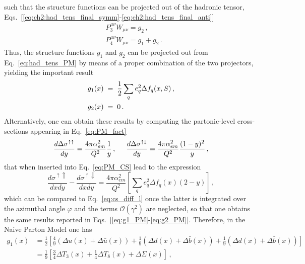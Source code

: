 such that the structure functions can be projected out of the hadronic tensor, Eqs.~[\ref{eq:ch2:had_tens_final_symm}-\ref{eq:ch2:had_tens_final_anti}]
\begin{align}
  &P_3^{\mu \nu} W_{\mu \nu} = g_2\,, \\
  &P_4^{\mu \nu} W_{\mu \nu} = g_1 + g_2 \,.
\end{align}
Thus, the structure functions $g_1$ and $g_2$ can be projected out from Eq.~\eqref{eq:had_tens_PM} by means of a proper combination of the two projectors, yielding the important result
\begin{align}
  &g_1(x) \hspace{1mm} = \hspace{1mm} \frac{1}{2} \sum_{q} e_q^2 \Delta f_{q} (x, S) \,,
  \label{eq:g1_PM}\\
  &g_2 (x) \hspace{1mm} = \hspace{1mm} 0\,.
  \label{eq:g2_PM}
\end{align}
Alternatively, one can obtain these results by computing the partonic-level cross-sections appearing in Eq.~\eqref{eq:PM_fact}
\begin{equation}
  \frac{d \Delta \sigma^{\uparrow \uparrow}}{dy} = \frac{4 \pi \alpha_{em}^2}{Q^2} \frac{1}{y} \,, \hspace{5mm} \frac{d \Delta \sigma^{\uparrow \downarrow}}{dy} = \frac{4 \pi \alpha_{em}^2}{Q^2} \frac{(1-y)^2}{y}\,,
\end{equation}
that when inserted into Eq.~\eqref{eq:PM_CS} lead to the expression
\begin{equation}
  \frac{d \sigma^{\uparrow \Uparrow}}{dx dy} - \frac{d \sigma^{\uparrow \Downarrow}}{dx dy} = \frac{4 \pi \alpha_{em}^2}{Q^2} \left[ \sum_{q} e_q^2 \Delta f_{q}(x) (2-y)\right] \,,
\end{equation}
which can be compared to Eq.~\eqref{eq:cs_diff_l} once the latter is integrated over the azimuthal angle $\varphi$ and the terms $\mathcal{O}(\gamma^2)$ are neglected, so that one obtains the same results reported in Eqs.~[\ref{eq:g1_PM}-\ref{eq:g2_PM}]. Therefore, in the Naive Parton Model one has
\begin{equation}
  \begin{split}
    g_1(x) & = \frac{1}{2} \left[ \frac{4}{9} \left( \Delta u(x) + \Delta \bar{u}(x) \right) + \frac{1}{9} \left(  \Delta d (x) + \Delta \bar{b}(x)  \right) + \frac{1}{9}\left(  \Delta d (x) + \Delta \bar{b}(x)  \right) \right] \\
    & = \frac{1}{9} \left[ \frac{3}{4} \Delta T_3 (x) + \frac{1}{4} \Delta T_8 (x) + \Delta \Sigma (x)  \right] \,,
  \end{split}
  \label{eq:g1_NPM_ev}
\end{equation}
